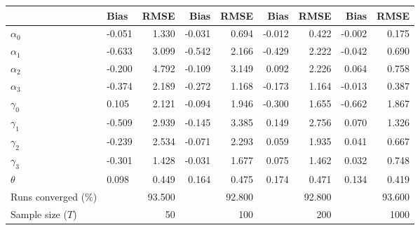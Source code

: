 
\begin{tabular}[t]{llrrrrrrr}
\toprule
  & Bias & RMSE & Bias & RMSE & Bias & RMSE & Bias & RMSE\\
\midrule
$\alpha_{0}$ & -0.051 & 1.330 & -0.031 & 0.694 & -0.012 & 0.422 & -0.002 & 0.175\\
$\alpha_{1}$ & -0.633 & 3.099 & -0.542 & 2.166 & -0.429 & 2.222 & -0.042 & 0.690\\
$\alpha_{2}$ & -0.200 & 4.792 & -0.109 & 3.149 & 0.092 & 2.226 & 0.064 & 0.758\\
$\alpha_{3}$ & -0.374 & 2.189 & -0.272 & 1.168 & -0.173 & 1.164 & -0.013 & 0.387\\
$\gamma_{0}$ & 0.105 & 2.121 & -0.094 & 1.946 & -0.300 & 1.655 & -0.662 & 1.867\\
$\gamma_{1}$ & -0.509 & 2.939 & -0.145 & 3.385 & 0.149 & 2.756 & 0.070 & 1.326\\
$\gamma_{2}$ & -0.239 & 2.534 & -0.071 & 2.293 & 0.059 & 1.935 & 0.041 & 0.667\\
$\gamma_{3}$ & -0.301 & 1.428 & -0.031 & 1.677 & 0.075 & 1.462 & 0.032 & 0.748\\
$\theta$ & 0.098 & 0.449 & 0.164 & 0.475 & 0.174 & 0.471 & 0.134 & 0.419\\
Runs converged (\%) &  & 93.500 &  & 92.800 &  & 92.800 &  & 93.600\\
Sample size ($T$) &  & 50 &  & 100 &  & 200 &  & 1000\\
\bottomrule
\end{tabular}

